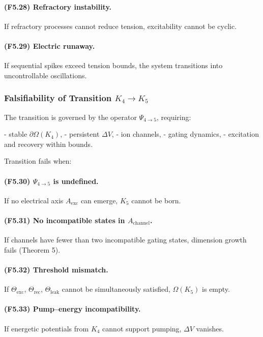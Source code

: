 \paragraph{(F5.28) Refractory instability.}
If refractory processes cannot reduce tension,
excitability cannot be cyclic.

\paragraph{(F5.29) Electric runaway.}
If sequential spikes exceed tension bounds,
the system transitions into uncontrollable oscillations.



\subsubsection{Falsifiability of Transition \texorpdfstring{$K_4 \to K_5$}{K_4 \to K_5}}

The transition is governed by the operator $\Psi_{4\to 5}$,
requiring:

- stable $\partial\Omega(K_4)$,
- persistent $\Delta V$,
- ion channels,
- gating dynamics,
- excitation and recovery within bounds.

Transition fails when:

\paragraph{(F5.30) $\Psi_{4\to 5}$ is undefined.}
If no electrical axis $A_{\mathrm{exc}}$ can emerge,
$K_5$ cannot be born.

\paragraph{(F5.31) No incompatible states in $A_{\mathrm{channel}}$.}
If channels have fewer than two incompatible gating states,
dimension growth fails (Theorem 5).

\paragraph{(F5.32) Threshold mismatch.}
If $\Theta_{\mathrm{exc}}$, $\Theta_{\mathrm{rec}}$,
$\Theta_{\mathrm{leak}}$ cannot be simultaneously satisfied,
$\Omega(K_5)$ is empty.

\paragraph{(F5.33) Pump–energy incompatibility.}
If energetic potentials from $K_4$ cannot support pumping,
$\Delta V$ vanishes.

